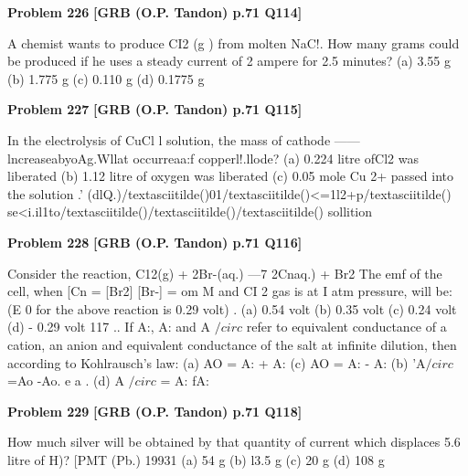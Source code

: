 \begin{problembox}
\textbf{Problem 226} \hfill \textbf{[GRB (O.P. Tandon) p.71 Q114]}
\label{q:ext-grb_all_questions-226}

A chemist wants to produce CI2 (g ) from molten NaC!. How 
many grams could be produced if he uses a steady current of 2 
ampere for 2.5 minutes? 
(a) 3.55 g 
(b) 1.775 g 
(c) 0.110 g 
(d) 0.1775 g
\end{problembox}

\begin{problembox}
\textbf{Problem 227} \hfill \textbf{[GRB (O.P. Tandon) p.71 Q115]}
\label{q:ext-grb_all_questions-227}

In the electrolysis of CuCl l solution, the mass of cathode 
------lncreaseabyoAg.Wllat occurreaa:f copperl!.llode? 
(a) 0.224 litre ofCl2 was liberated 
(b) 1.12 litre of oxygen was liberated 
(c) 0.05 mole Cu 2+ passed into the solution 
.' (dlQ.)/textasciitilde()01/textasciitilde()<=1l2+p/textasciitilde() se<i.il1\underline{\hspace{1cm}}to\underline{\hspace{1cm}}/textasciitilde()/textasciitilde()/textasciitilde() sollition
\end{problembox}

\begin{problembox}
\textbf{Problem 228} \hfill \textbf{[GRB (O.P. Tandon) p.71 Q116]}
\label{q:ext-grb_all_questions-228}

Consider the reaction, 
C12(g) + 2Br-(aq.) ---7 2Cnaq.) + Br2 
The emf of the cell, when [Cn = [Br2] 
[Br-] = om M and 
CI 2 gas is at I atm pressure, will be: (E 0 for the above reaction 
is 0.29 volt) 
. 
(a) 0.54 volt (b) 0.35 volt (c) 0.24 volt (d) - 0.29 volt 
117 .. If A:, A: and A $/circ$ refer to equivalent conductance of a cation, an 
anion and equivalent conductance of the salt at infinite 
dilution, then according to Kohlrausch's law: 
(a) AO = A: + A: 
(c) AO = A: - A: 
(b) 'A$/circ$=Ao -Ao. 
e 
a 
. (d) A $/circ$ = A: fA:
\end{problembox}

\begin{problembox}
\textbf{Problem 229} \hfill \textbf{[GRB (O.P. Tandon) p.71 Q118]}
\label{q:ext-grb_all_questions-229}

How much silver will be obtained by that quantity of current 
which displaces 5.6 litre of H)? 
[PMT (Pb.) 19931 
(a) 54 g 
(b) l3.5 g 
(c) 20 g 
(d) 108 g
\end{problembox}

